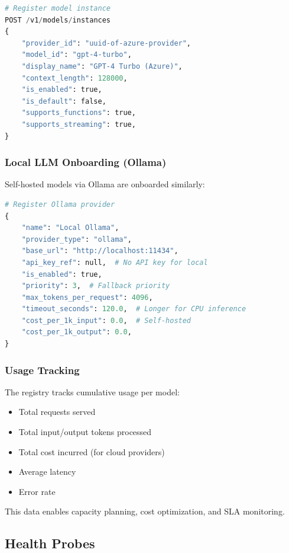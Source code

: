\begin{lstlisting}[language=Python, caption={Model instance registration}, label=lst:model-registration]
# Register model instance
POST /v1/models/instances
{
    "provider_id": "uuid-of-azure-provider",
    "model_id": "gpt-4-turbo",
    "display_name": "GPT-4 Turbo (Azure)",
    "context_length": 128000,
    "is_enabled": true,
    "is_default": false,
    "supports_functions": true,
    "supports_streaming": true,
}
\end{lstlisting}

\subsubsection{Local LLM Onboarding (Ollama)}

Self-hosted models via Ollama are onboarded similarly:

\begin{lstlisting}[language=Python, caption={Ollama provider registration}, label=lst:ollama-registration]
# Register Ollama provider
{
    "name": "Local Ollama",
    "provider_type": "ollama",
    "base_url": "http://localhost:11434",
    "api_key_ref": null,  # No API key for local
    "is_enabled": true,
    "priority": 3,  # Fallback priority
    "max_tokens_per_request": 4096,
    "timeout_seconds": 120.0,  # Longer for CPU inference
    "cost_per_1k_input": 0.0,  # Self-hosted
    "cost_per_1k_output": 0.0,
}
\end{lstlisting}

\subsubsection{Usage Tracking}

The registry tracks cumulative usage per model:

\begin{itemize}
    \item Total requests served
    \item Total input/output tokens processed
    \item Total cost incurred (for cloud providers)
    \item Average latency
    \item Error rate
\end{itemize}

This data enables capacity planning, cost optimization, and SLA monitoring.

\subsection{Health Probes}

